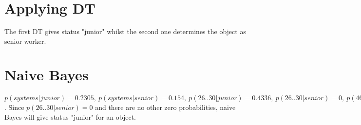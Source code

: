 \documentclass{article}
\begin{document}
\section{Applying DT}

The first DT gives status "junior" whilst the second one determines the object as senior worker.

\section{Naive Bayes}

$p(systems | junior) =  0.2305, \ p(systems | senior) = 0.154, \ p(26..30 | junior) = 0.4336, \ p(26..30 | senior) = 0, \ p(46-50K| junior) = 0.2035, \ p(46-50K|senior) = 0.19$. Since $p(26..30 | senior) = 0$ and there are no other zero probabilities, naive Bayes will give status "junior" for an object.
\end{document}
